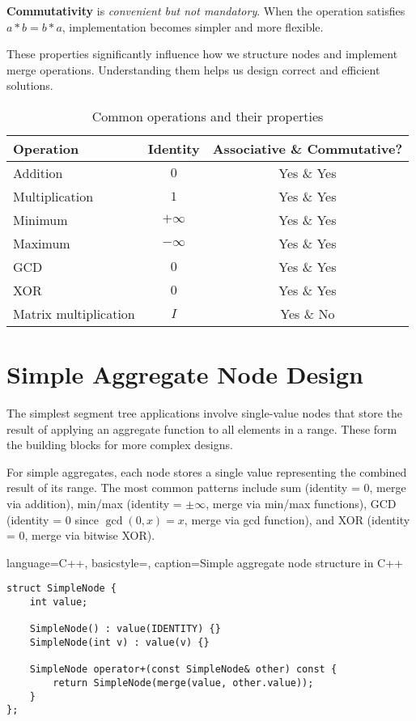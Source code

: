 \textbf{Commutativity} is \emph{convenient but not mandatory}. When the operation satisfies $a \ast b = b \ast a$, implementation becomes simpler and more flexible.

These properties significantly influence how we structure nodes and implement merge operations. Understanding them helps us design correct and efficient solutions.

\begin{table}
\centering
\begin{tabular}{lcc}
\textbf{Operation} & \textbf{Identity} & \textbf{Associative \& Commutative?} \\
\hline
Addition & $0$ & Yes \& Yes \\
Multiplication & $1$ & Yes \& Yes \\
Minimum & $+\infty$ & Yes \& Yes \\
Maximum & $-\infty$ & Yes \& Yes \\
GCD & $0$ & Yes \& Yes \\
XOR & $0$ & Yes \& Yes \\
Matrix multiplication & $I$ & Yes \& No \\
\end{tabular}
\caption{Common operations and their properties}
\end{table}

\section{Simple Aggregate Node Design}

The simplest segment tree applications involve single-value nodes that store the result of applying an aggregate function to all elements in a range. These form the building blocks for more complex designs.

For simple aggregates, each node stores a single value representing the combined result of its range. The most common patterns include sum (identity = $0$, merge via addition), min/max (identity = $\pm\infty$, merge via min/max functions), GCD (identity = $0$ since $\gcd(0, x) = x$, merge via gcd function), and XOR (identity = $0$, merge via bitwise XOR).

\begin{marginlisting}[0pt]{language=C++, basicstyle=\ttfamily\scriptsize, caption=Simple aggregate node structure in C++}
\begin{lstlisting}
struct SimpleNode {
    int value;
    
    SimpleNode() : value(IDENTITY) {}
    SimpleNode(int v) : value(v) {}
    
    SimpleNode operator+(const SimpleNode& other) const {
        return SimpleNode(merge(value, other.value));
    }
};
\end{lstlisting}
\end{marginlisting}

